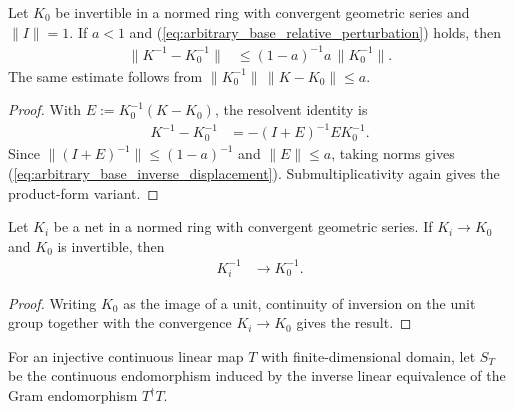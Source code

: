 \begin{lemma}
    \label{thm:arbitrary_base_neumann_inverse_displacement}
    \leanok
    Let $K_0$ be invertible in a normed ring with convergent geometric series
    and $\lVert I\rVert=1$.  If $a<1$ and
    (\ref{eq:arbitrary_base_relative_perturbation}) holds, then
    \begin{align}
        \lVert K^{-1}-K_0^{-1}\rVert
         & \le(1-a)^{-1}a\,\lVert K_0^{-1}\rVert.
        \label{eq:arbitrary_base_inverse_displacement}
    \end{align}
    The same estimate follows from
    $\lVert K_0^{-1}\rVert\,\lVert K-K_0\rVert\le a$.
\end{lemma}

\begin{proof}
    \leanok
    With $E:=K_0^{-1}(K-K_0)$, the resolvent identity is
    \begin{align}
        K^{-1}-K_0^{-1}
         & =-(I+E)^{-1}E K_0^{-1}.
    \end{align}
    Since $\lVert(I+E)^{-1}\rVert\le(1-a)^{-1}$ and
    $\lVert E\rVert\le a$, taking norms gives
    (\ref{eq:arbitrary_base_inverse_displacement}).  Submultiplicativity again
    gives the product-form variant.
\end{proof}

\begin{lemma}
    \label{thm:inverse_tendsto_at_unit}
    \leanok
    Let $K_i$ be a net in a normed ring with convergent geometric series.  If
    $K_i\to K_0$ and $K_0$ is invertible, then
    \begin{align}
        K_i^{-1} & \longrightarrow K_0^{-1}.
    \end{align}
\end{lemma}

\begin{proof}
    \leanok
    Writing $K_0$ as the image of a unit, continuity of inversion on the unit
    group together with the convergence $K_i\to K_0$ gives the result.
\end{proof}

\begin{definition}
    \label{def:inverse_gram}
    \leanok
    For an injective continuous linear map $T$ with finite-dimensional domain,
    let $S_T$ be the continuous endomorphism induced by the inverse linear
    equivalence of the Gram endomorphism $T^\dagger T$.
\end{definition}

